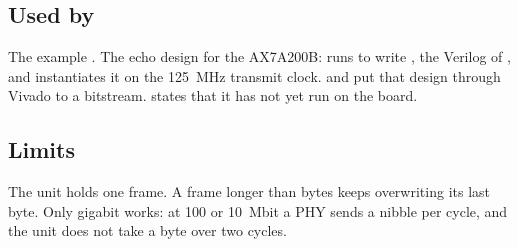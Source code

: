 \subsection*{Used by}

The example . The echo design for the AX7A200B:
 runs  to write
, the Verilog of , and
 instantiates it on the 125~MHz transmit
clock.  and  put that
design through Vivado to a bitstream.  states that it
has not yet run on the board.

\subsection*{Limits}

The unit holds one frame. A frame longer than  bytes
keeps overwriting its last byte. Only gigabit works: at 100 or
10~Mbit a PHY sends a nibble per cycle, and the unit does not take a
byte over two cycles.
